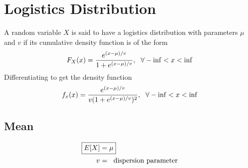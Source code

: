 \documentclass[../probability-notes.tex]{subfiles}
\begin{document}
    \section{Logistics Distribution}
    A random variable $X$ is said to have a logistics distribution with parameters $\mu$ and $v$ if its cumulative density function is of the form
    \begin{align*}
        F_{X}(x) = \frac{e^{(x-\mu)/ v}}{1 + e^{(x-\mu)/ v}}, \text{\; $\forall - \inf < x < \inf$}
    \end{align*}
    Differentiating to get the density function
    \begin{align*}
        f_{x}(x) = \frac{e^{(x-\mu)/v}}{v(1 + e^{(x-\mu)/v})^{2}}, \text{\; $\forall -\inf < x < \inf$}
    \end{align*}

    \subsection{Mean}
    \begin{align*}
        \Aboxed{E[X] &= \mu}\\
        v &= \text{\; dispersion parameter}
    \end{align*}
\end{document}
